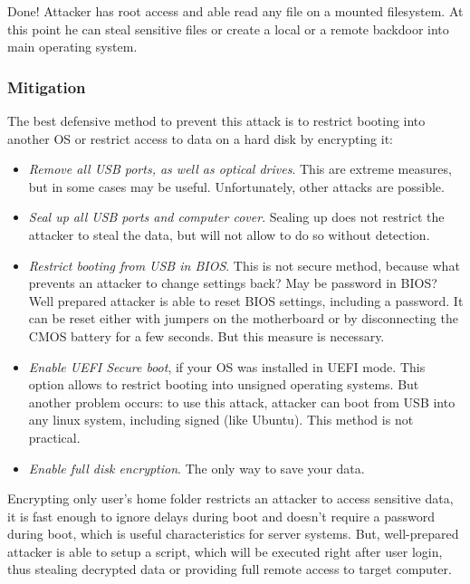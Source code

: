 Done! Attacker has root access and able read any file on a mounted filesystem. At this point he can steal sensitive files or create a local or a remote backdoor into main operating system. 


\subsubsection*{Mitigation}
The best defensive method to prevent this attack is to restrict booting into another OS or restrict access to data on a hard disk by encrypting it:

\begin{itemize}
    \item \textit{Remove all USB ports, as well as optical drives}. This are extreme measures, but in some cases may be useful. Unfortunately, other attacks are possible.
    
    \item \textit{Seal up all USB ports and computer cover}. Sealing up does not restrict the attacker to steal the data, but will not allow to do so without detection. 
    
    \item \textit{Restrict booting from USB in BIOS}. This is not secure method, because what prevents an attacker to change settings back? May be password in BIOS? Well prepared attacker is able to reset BIOS settings, including a password. It can be reset either with jumpers on the motherboard or by disconnecting the CMOS battery for a few seconds. But this measure is necessary.
    
    \item \textit{Enable UEFI Secure boot}, if your OS was installed in UEFI mode. This option allows to restrict booting into unsigned operating systems. But another problem occurs: to use this attack, attacker can boot from USB into any linux system, including signed (like Ubuntu). This method is not practical.
    
    \item \textit{Enable full disk encryption}. The only way to save your data. 
\end{itemize}

Encrypting only user's home folder restricts an attacker to access sensitive data, it is fast enough to ignore delays during boot and doesn't require a password during boot, which is useful characteristics for server systems. But, well-prepared attacker is able to setup a script, which will be executed right after user login, thus stealing decrypted data or providing full remote access to target computer.


